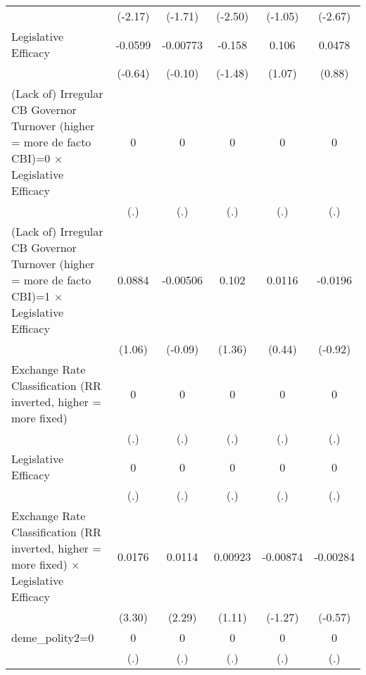 {\begin{tabular*}{\linewidth}{@{\hskip\tabcolsep\extracolsep\fill}l*{5}{c}}
                &  (-2.17)         &  (-1.71)         &  (-2.50)         &  (-1.05)         &  (-2.67)         \\
\addlinespace
Legislative Efficacy&  -0.0599         & -0.00773         &   -0.158         &    0.106         &   0.0478         \\
                &  (-0.64)         &  (-0.10)         &  (-1.48)         &   (1.07)         &   (0.88)         \\
\addlinespace
(Lack of) Irregular CB Governor Turnover (higher = more de facto CBI)=0 $\times$ Legislative Efficacy&        0         &        0         &        0         &        0         &        0         \\
                &      (.)         &      (.)         &      (.)         &      (.)         &      (.)         \\
\addlinespace
(Lack of) Irregular CB Governor Turnover (higher = more de facto CBI)=1 $\times$ Legislative Efficacy&   0.0884         & -0.00506         &    0.102         &   0.0116         &  -0.0196         \\
                &   (1.06)         &  (-0.09)         &   (1.36)         &   (0.44)         &  (-0.92)         \\
\addlinespace
Exchange Rate Classification (RR inverted, higher = more fixed)&        0         &        0         &        0         &        0         &        0         \\
                &      (.)         &      (.)         &      (.)         &      (.)         &      (.)         \\
\addlinespace
Legislative Efficacy&        0         &        0         &        0         &        0         &        0         \\
                &      (.)         &      (.)         &      (.)         &      (.)         &      (.)         \\
\addlinespace
Exchange Rate Classification (RR inverted, higher = more fixed) $\times$ Legislative Efficacy&   0.0176\sym{**} &   0.0114\sym{*}  &  0.00923         & -0.00874         & -0.00284         \\
                &   (3.30)         &   (2.29)         &   (1.11)         &  (-1.27)         &  (-0.57)         \\
\addlinespace
deme\_polity2=0  &        0         &        0         &        0         &        0         &        0         \\
                &      (.)         &      (.)         &      (.)         &      (.)         &      (.)         \\

\end{tabular*}}
